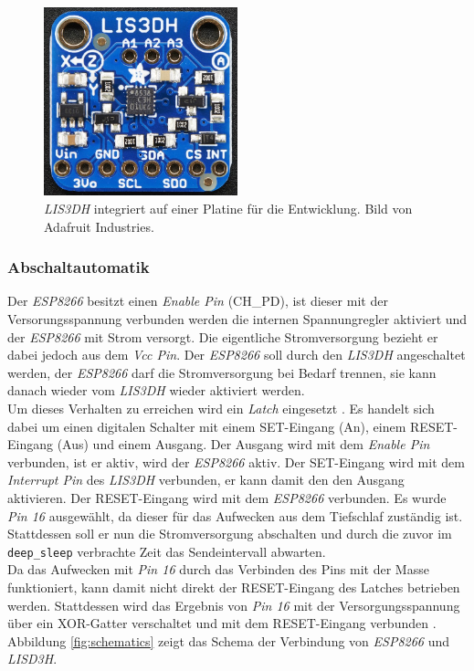 \begin{figure}[h]
  \centering
	\includegraphics[width=0.5\textwidth]{images/lis3dhada.png}
  \caption{\emph{LIS3DH} integriert auf einer Platine für die Entwicklung. Bild von Adafruit Industries\protect \footnotemark.}
  \label{fig:lis3dh}
\end{figure}

\subsubsection{Abschaltautomatik}
\label{ch:Beschleunigungssensor:sec:Abschaltautomatik}
Der \emph{ESP8266} besitzt einen \emph{Enable Pin} (CH\_PD), ist dieser mit der Versorungsspannung verbunden werden die internen Spannungregler aktiviert und der \emph{ESP8266} mit Strom versorgt.
Die eigentliche Stromversorgung bezieht er dabei jedoch aus dem \emph{Vcc Pin}.
Der \emph{ESP8266} soll durch den \emph{LIS3DH} angeschaltet werden, der \emph{ESP8266} darf die Stromversorgung bei Bedarf trennen, sie kann danach wieder vom \emph{LIS3DH} wieder aktiviert werden. \\
Um dieses Verhalten zu erreichen wird ein \emph{Latch} eingesetzt \cite{texas2003latch}.
Es handelt sich dabei um einen digitalen Schalter mit einem SET-Eingang (An), einem RESET-Eingang (Aus) und einem Ausgang.
Der Ausgang wird mit dem \emph{Enable Pin} verbunden, ist er aktiv, wird der \emph{ESP8266} aktiv.
Der SET-Eingang wird mit dem \emph{Interrupt Pin} des \emph{LIS3DH} verbunden, er kann damit den den Ausgang aktivieren.
Der RESET-Eingang wird mit dem \emph{ESP8266} verbunden. 
Es wurde \emph{Pin 16} ausgewählt, da dieser für das Aufwecken aus dem Tiefschlaf zuständig ist. 
Stattdessen soll er nun die Stromversorgung abschalten und durch die zuvor im \texttt{deep\_sleep} verbrachte Zeit das Sendeintervall abwarten.\\
Da das Aufwecken mit \emph{Pin 16} durch das Verbinden des Pins mit der Masse funktioniert, kann damit nicht direkt der RESET-Eingang des Latches betrieben werden.
Stattdessen wird das Ergebnis von \emph{Pin 16} mit der Versorgungsspannung über ein XOR-Gatter verschaltet und mit dem RESET-Eingang verbunden \cite{texas2014xor}.
Abbildung \ref{fig:schematics} zeigt das Schema der Verbindung von \emph{ESP8266} und \emph{LISD3H}.

